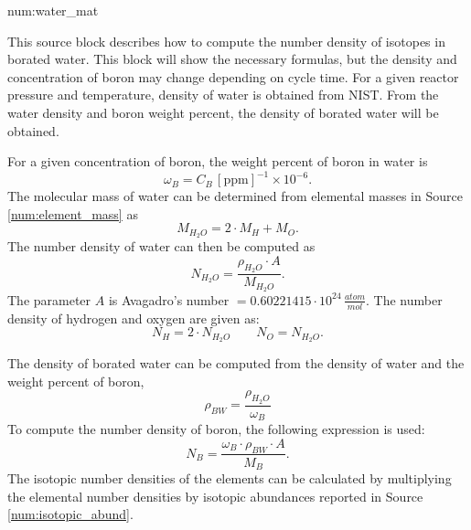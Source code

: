 \begin{numitem}{num:water_mat}

    This source block describes how to compute the number density of isotopes in borated water. This block will show the necessary formulas, but the density and concentration of boron may change depending on cycle time. For a given reactor pressure and temperature, density of water is obtained from NIST. From the water density and boron weight percent, the density of borated water will be obtained.
    
    For a given concentration of boron, the weight percent of boron in water is
\[
   \omega_B = C_B\mathrm{\,\left[ppm\right]^{-1}}\times10^{-6}.
\]
The molecular mass of water can be determined from elemental masses in Source \ref{num:element_mass} as
\[
    M_{H_2O} = 2\cdot M_H + M_O.
\]
The number density of water can then be computed as
\[
    N_{H_2O} = \frac{\rho_{H_2O}\cdot A}{M_{H_2O}}.
\]
The parameter $A$ is Avagadro's number $=0.60221415\cdot 10^{24}\,\frac{atom}{mol}$. The number density of hydrogen and oxygen are given as:
\[
    N_H = 2\cdot N_{H_2O} \qquad N_O = N_{H_2O}.
\]

The density of borated water can be computed from the density of water and the weight percent of boron,
\[
    \rho_{BW} = \frac{\rho_{H_2O}}{\omega_B}
\]
To compute the number density of boron, the following expression is used:
\[
    N_B = \frac{\omega_B\cdot\rho_{BW}\cdot A}{M_B}.
\]
The isotopic number densities of the elements can be calculated by multiplying the elemental number densities by isotopic abundances reported in Source \ref{num:isotopic_abund}.


\end{numitem}


